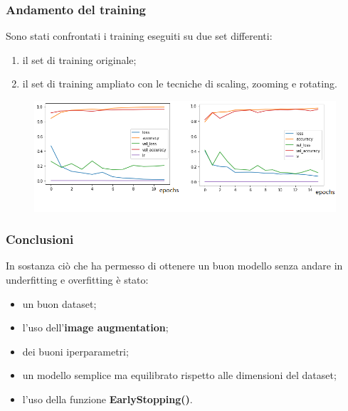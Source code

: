 \documentclass{beamer}
\begin{document}
\begin{frame}
	\frametitle{Andamento del training}
	Sono stati confrontati i training eseguiti su due set differenti:
	\begin{enumerate}
		\item il set di training originale;
		\item il set di training ampliato con le tecniche di scaling, zooming e rotating.
	\end{enumerate}

	\begin{figure}
		\includegraphics[width=1\textwidth]{history-pneumonia-no-aug.png}
	\end{figure}

	
\end{frame}

\begin{frame}
	\frametitle{Conclusioni}
	In sostanza ciò che ha permesso di ottenere un buon modello senza andare in underfitting
	e overfitting è stato:
	\begin{itemize}
		\item un buon dataset;
		\item l'uso dell'\textbf{image augmentation};
		\item dei buoni iperparametri;
		\item un modello semplice ma equilibrato rispetto alle dimensioni del dataset;
		\item l'uso della funzione \textbf{EarlyStopping()}.
	\end{itemize}
	
\end{frame}
\end{document}
